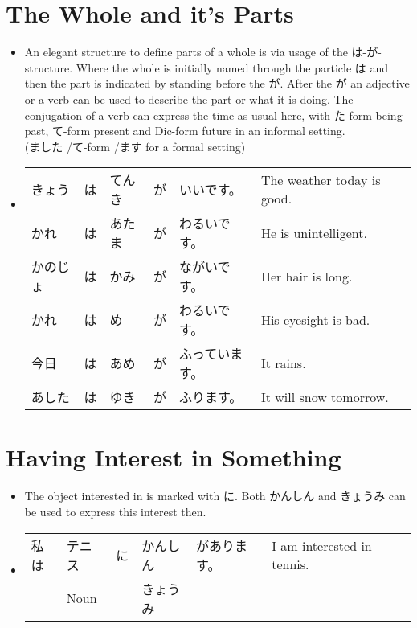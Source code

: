 \documentclass{article}
\begin{document}
\section{The Whole and it's Parts}
\begin{itemize}
\item An elegant structure to define parts of a whole is via usage of the は-が-structure. Where the whole is initially named through the particle は and then the part is indicated by standing before the が. After the が an adjective or a verb can be used to describe the part or what it is doing. The conjugation of a verb can express the time as usual here, with た-form being past, て-form present and Dic-form future in an informal setting. \\ (ました /て-form /ます for a formal setting)\\
\item \begin{tabular}{ l l l l l l l }
きょう&は&てんき&が&いいです。 & The weather today is good.\\
かれ&は&あたま&が&わるいです。 & He is unintelligent.\\
かのじょ&は&かみ&が&ながいです。 & Her hair is long.\\
かれ&は&め&が&わるいです。 & His eyesight is bad.\\
今日&は&あめ&が&ふっています。 & It rains.\\
あした&は&ゆき&が&ふります。 & It will snow tomorrow.
\end{tabular}
\end{itemize}
\section{Having Interest in Something}
\begin{itemize}
\item The object interested in is marked with に. Both かんしん and きょうみ can be used to express this interest then.
\item \begin{tabular}{ l l l l l l l }
私は&テニス&に&かんしん&があります。 &I am interested in tennis. \\
   &Noun&&きょうみ&&
\end{tabular}
\end{itemize}
\end{document}
